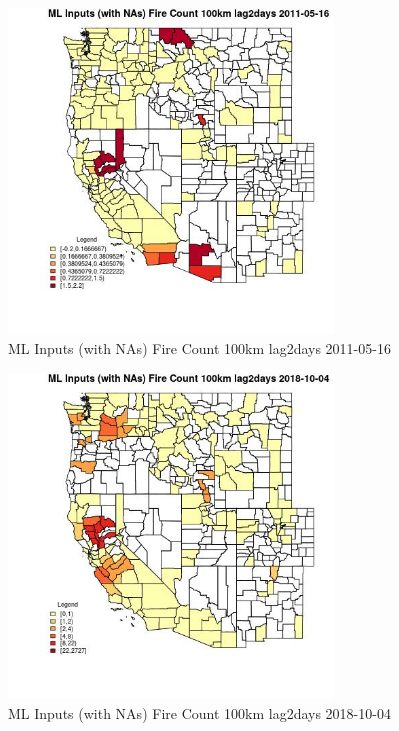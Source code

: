 \begin{figure} 
\centering  
\includegraphics[width=0.77\textwidth]{Code_Outputs/Report_ML_input_PM25_Step4_part_f_de_duplicated_aveswNAs_CountyFire_Count_100km_lag2daysMean2011-05-16.jpg} 
\caption{\label{fig:Report_ML_input_PM25_Step4_part_f_de_duplicated_aveswNAsCountyFire_Count_100km_lag2daysMean2011-05-16}ML Inputs (with NAs) Fire Count 100km lag2days 2011-05-16} 
\end{figure} 
 

\begin{figure} 
\centering  
\includegraphics[width=0.77\textwidth]{Code_Outputs/Report_ML_input_PM25_Step4_part_f_de_duplicated_aveswNAs_CountyFire_Count_100km_lag2daysMean2018-10-04.jpg} 
\caption{\label{fig:Report_ML_input_PM25_Step4_part_f_de_duplicated_aveswNAsCountyFire_Count_100km_lag2daysMean2018-10-04}ML Inputs (with NAs) Fire Count 100km lag2days 2018-10-04} 
\end{figure} 
 

